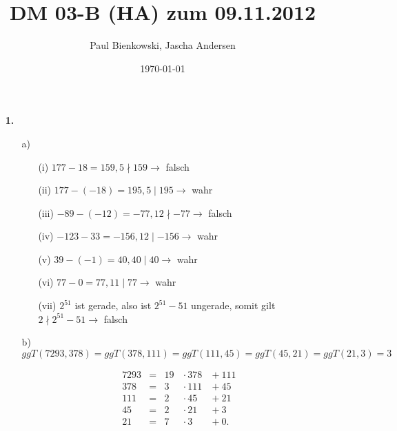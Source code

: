 \documentclass[a4paper,10pt]{scrartcl}
\author{Paul Bienkowski, Jascha Andersen}
\title{DM 03-B (HA) zum 09.11.2012}
\date{\today}
\begin{document}
\setcounter{secnumdepth}{0}
\maketitle

\begin{enumerate}
    \item[\textbf{1.}]
        \begin{enumerate}
            \item[a)]
                \begin{enumerate}
                    \item[(i)]      $177 - 18 = 159, 5 \nmid 159 \rightarrow$ falsch
                    \item[(ii)]     $177 - (-18) = 195, 5 \mid 195 \rightarrow$ wahr
                    \item[(iii)]    $-89 - (-12) = -77, 12 \nmid -77 \rightarrow$ falsch
                    \item[(iv)]     $-123 - 33= -156, 12 \mid -156 \rightarrow$ wahr
                    \item[(v)]      $39 - (-1) = 40, 40 \mid 40 \rightarrow$ wahr
                    \item[(vi)]     $77 - 0 = 77, 11 \mid 77 \rightarrow$  wahr
                    \item[(vii)]    $2^{51}$ ist gerade, also ist $2^{51} - 51$ ungerade, somit gilt $2 \nmid 2^{51} -51 \rightarrow$ falsch
                \end{enumerate}

            \item[b)]
                $ggT(7293, 378) = ggT(378, 111) = ggT(111, 45) = ggT(45, 21) = ggT(21, 3) = 3$

                $$\begin{array}{rcrll}
                    7293 &=& 19 &{}\cdot 378 &{}+ 111\\
                    378  &=&  3 &{}\cdot 111 &{}+ 45\\
                    111  &=&  2 &{}\cdot  45 &{}+ 21\\
                    45   &=&  2 &{}\cdot  21 &{}+ 3\\
                    21   &=&  7 &{}\cdot   3 &{}+ 0.
                \end{array}$$


\end{enumerate}
\end{enumerate}
\end{document}
